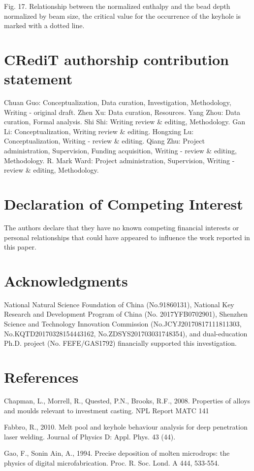 \documentclass[10pt]{article}
\begin{document}
Fig. 17. Relationship between the normalized enthalpy and the bead depth normalized by beam size, the critical value for the occurrence of the keyhole is marked with a dotted line.

\section*{CRediT authorship contribution statement}
Chuan Guo: Conceptualization, Data curation, Investigation, Methodology, Writing - original draft. Zhen Xu: Data curation, Resources. Yang Zhou: Data curation, Formal analysis. Shi Shi: Writing review \& editing, Methodology. Gan Li: Conceptualization, Writing review \& editing. Hongxing Lu: Conceptualization, Writing - review \& editing. Qiang Zhu: Project administration, Supervision, Funding acquisition, Writing - review \& editing, Methodology. R. Mark Ward: Project administration, Supervision, Writing - review \& editing, Methodology.

\section*{Declaration of Competing Interest}
The authors declare that they have no known competing financial interests or personal relationships that could have appeared to influence the work reported in this paper.

\section*{Acknowledgments}
National Natural Science Foundation of China (No.91860131), National Key Research and Development Program of China (No. 2017YFB0702901), Shenzhen Science and Technology Innovation Commission (No.JCYJ20170817111811303, No.KQTD20170328154443162, No.ZDSYS201703031748354), and dual-education Ph.D. project (No. FEFE/GAS1792) financially supported this investigation.

\section*{References}
Chapman, L., Morrell, R., Quested, P.N., Brooks, R.F., 2008. Properties of alloys and moulds relevant to investment casting. NPL Report MATC 141

Fabbro, R., 2010. Melt pool and keyhole behaviour analysis for deep penetration laser welding. Journal of Physics D: Appl. Phys. 43 (44).

Gao, F., Sonin Ain, A., 1994. Precise deposition of molten microdrops: the physics of digital microfabrication. Proc. R. Soc. Lond. A 444, 533-554.
\end{document}
